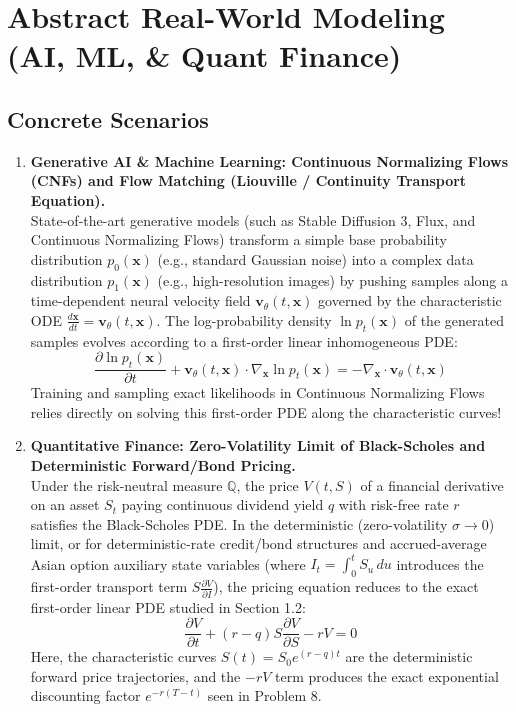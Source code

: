 \documentclass[11pt]{article}
\begin{document}
\section{Abstract Real-World Modeling (AI, ML, \& Quant Finance)}

\subsection{Concrete Scenarios}
\begin{enumerate}
    \item \textbf{Generative AI \& Machine Learning: Continuous Normalizing Flows (CNFs) and Flow Matching (Liouville / Continuity Transport Equation).} \\
    State-of-the-art generative models (such as Stable Diffusion 3, Flux, and Continuous Normalizing Flows) transform a simple base probability distribution $p_0(\mathbf{x})$ (e.g., standard Gaussian noise) into a complex data distribution $p_1(\mathbf{x})$ (e.g., high-resolution images) by pushing samples along a time-dependent neural velocity field $\mathbf{v}_\theta(t, \mathbf{x})$ governed by the characteristic ODE $\frac{d\mathbf{x}}{dt} = \mathbf{v}_\theta(t, \mathbf{x})$. The log-probability density $\ln p_t(\mathbf{x})$ of the generated samples evolves according to a first-order linear inhomogeneous PDE:
    \[
    \frac{\partial \ln p_t(\mathbf{x})}{\partial t} + \mathbf{v}_\theta(t, \mathbf{x}) \cdot \nabla_{\mathbf{x}} \ln p_t(\mathbf{x}) = -\nabla_{\mathbf{x}} \cdot \mathbf{v}_\theta(t, \mathbf{x})
    \]
    Training and sampling exact likelihoods in Continuous Normalizing Flows relies directly on solving this first-order PDE along the characteristic curves!

    \item \textbf{Quantitative Finance: Zero-Volatility Limit of Black-Scholes and Deterministic Forward/Bond Pricing.} \\
    Under the risk-neutral measure $\mathbb{Q}$, the price $V(t, S)$ of a financial derivative on an asset $S_t$ paying continuous dividend yield $q$ with risk-free rate $r$ satisfies the Black-Scholes PDE. In the deterministic (zero-volatility $\sigma \to 0$) limit, or for deterministic-rate credit/bond structures and accrued-average Asian option auxiliary state variables (where $I_t = \int_0^t S_u\,du$ introduces the first-order transport term $S \frac{\partial V}{\partial I}$), the pricing equation reduces to the exact first-order linear PDE studied in Section 1.2:
    \[
    \frac{\partial V}{\partial t} + (r - q)S\frac{\partial V}{\partial S} - rV = 0
    \]
    Here, the characteristic curves $S(t) = S_0 e^{(r-q)t}$ are the deterministic forward price trajectories, and the $-rV$ term produces the exact exponential discounting factor $e^{-r(T-t)}$ seen in Problem 8.


\end{enumerate}
\end{document}
